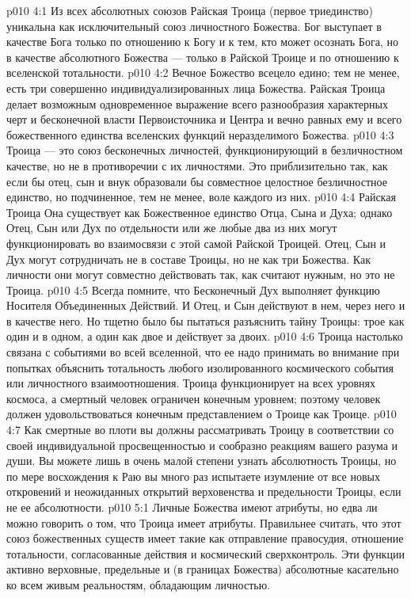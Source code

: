 \vs p010 4:1 Из всех абсолютных союзов Райская Троица (первое триединство) уникальна как исключительный союз личностного Божества. Бог выступает в качестве Бога только по отношению к Богу и к тем, кто может осознать Бога, но в качестве абсолютного Божества --- только в Райской Троице и по отношению к вселенской тотальности.
\vs p010 4:2 \pc Вечное Божество всецело едино; тем не менее, есть три совершенно индивидуализированных лица Божества. Райская Троица делает возможным одновременное выражение всего разнообразия характерных черт и бесконечной власти Первоисточника и Центра и вечно равных ему и всего божественного единства вселенских функций неразделимого Божества.
\vs p010 4:3 Троица --- это союз бесконечных личностей, функционирующий в безличностном качестве, но не в противоречии с их личностями. Это приблизительно так, как если бы отец, сын и внук образовали бы совместное целостное безличностное единство, но подчиненное, тем не менее, воле каждого из них.
\vs p010 4:4 Райская Троица  Она существует как Божественное единство Отца, Сына и Духа; однако Отец, Сын или Дух по отдельности или же любые два из них могут функционировать во взаимосвязи с этой самой Райской Троицей. Отец, Сын и Дух могут сотрудничать не в составе Троицы, но не как три Божества. Как личности они могут совместно действовать так, как считают нужным, но это не Троица.
\vs p010 4:5 \pc Всегда помните, что Бесконечный Дух выполняет функцию Носителя Объединенных Действий. И Отец, и Сын действуют в нем, через него и в качестве него. Но тщетно было бы пытаться разъяснить тайну Троицы: трое как один и в одном, а один как двое и действует за двоих.
\vs p010 4:6 \pc Троица настолько связана с событиями во всей вселенной, что ее надо принимать во внимание при попытках объяснить тотальность любого изолированного космического события или личностного взаимоотношения. Троица функционирует на всех уровнях космоса, а смертный человек ограничен конечным уровнем; поэтому человек должен удовольствоваться конечным представлением о Троице как Троице.
\vs p010 4:7 Как смертные во плоти вы должны рассматривать Троицу в соответствии со своей индивидуальной просвещенностью и сообразно реакциям вашего разума и души. Вы можете лишь в очень малой степени узнать абсолютность Троицы, но по мере восхождения к Раю вы много раз испытаете изумление от все новых откровений и неожиданных открытий верховенства и предельности Троицы, если не ее абсолютности.
\vs p010 5:1 Личные Божества имеют атрибуты, но едва ли можно говорить о том, что Троица имеет атрибуты. Правильнее считать, что этот союз божественных существ имеет такие  как отправление правосудия, отношение тотальности, согласованные действия и космический сверхконтроль. Эти функции активно верховные, предельные и (в границах Божества) абсолютные касательно ко всем живым реальностям, обладающим личностью.
